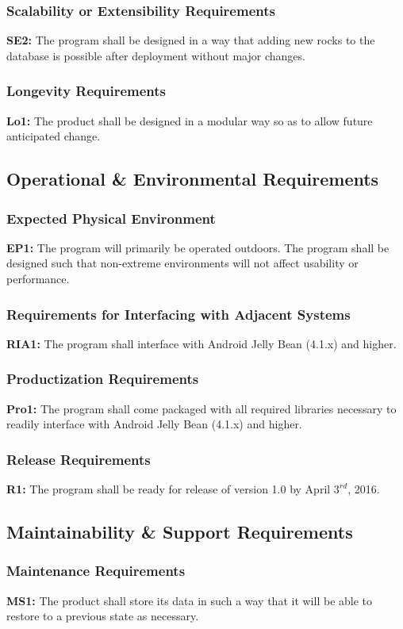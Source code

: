 \documentclass[titlepage]{article}
\begin{document}
\subsubsection{Scalability or Extensibility Requirements}
\textbf{SE2:} The program shall be designed in a way that adding new rocks to the database is possible after deployment without major changes.
\subsubsection{Longevity Requirements}
\textbf{Lo1:} The product shall be designed in a modular way so as to allow future anticipated change.

\subsection{Operational \& Environmental Requirements}
\subsubsection{Expected Physical Environment}
\textbf{EP1:} The program will primarily be operated outdoors. The program shall be designed such that non-extreme environments will not affect usability or performance.
\subsubsection{Requirements for Interfacing with Adjacent Systems}
\textbf{RIA1:} The program shall interface with Android Jelly Bean (4.1.x) and higher.
\subsubsection{Productization Requirements}
\textbf{Pro1:} The program shall come packaged with all required libraries necessary to readily interface with Android Jelly Bean (4.1.x) and higher.
\subsubsection{Release Requirements}
\textbf{R1:} The program shall be ready for release of version 1.0 by April $3^{rd}$, 2016.

\subsection{Maintainability \& Support Requirements}
\subsubsection{Maintenance Requirements}
\textbf{MS1:} The product shall store its data in such a way that it will be able to restore to a previous state as necessary.
\end{document}

